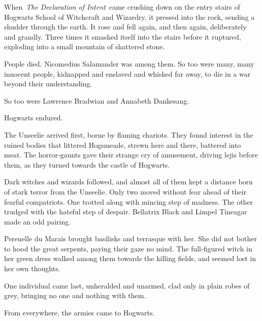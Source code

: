 When~\emph{The Declaration of Intent}~came crushing down on the entry
stairs of Hogwarts School of Witchcraft and Wizardry, it pressed into
the rock, sending a shudder through the earth. It rose and fell again,
and then again, deliberately and grandly. Three times it smashed itself
into the stairs before it ruptured, exploding into a small mountain of
shattered stone.

People died. Nicomedius Salamander was among them. So too were many,
many innocent people, kidnapped and enslaved and whisked far away, to
die in a war beyond their understanding.

So too were Lawrence Bradwian and Annabeth Dankesang.

\mybreak

Hogwarts endured.

\mybreak

The Unseelie arrived first, borne by flaming chariots. They found
interest in the ruined bodies that littered Hogsmeade, strewn here and
there, battered into meat. The horror-gaunts gave their strange cry of
amusement, driving lejis before them, as they turned towards the castle
of Hogwarts.

Dark witches and wizards followed, and almost all of them kept a
distance born of stark terror from the Unseelie. Only two moved without
fear ahead of their fearful compatriots. One trotted along with mincing
step of madness. The other trudged with the hateful step of despair.
Bellatrix Black and Limpel Tineagar made an odd pairing.

Perenelle du Marais brought basilisks and terrasque with her. She did
not bother to hood the great serpents, paying their gaze no mind. The
full-figured witch in her green dress walked among them towards the
killing fields, and seemed lost in her own thoughts.

One individual came last, unheralded and unarmed, clad only in plain
robes of grey, bringing no one and nothing with them.

From everywhere, the armies came to Hogwarts.
